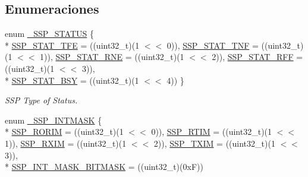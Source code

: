 \subsection*{Enumeraciones}
\begin{DoxyCompactItemize}
\item 
enum \hyperlink{group___s_s_p__18_x_x__43_x_x_ga4ec33a0121a2ccab848c7b37907d9e9d}{\+\_\+\+S\+S\+P\+\_\+\+S\+T\+A\+T\+US} \{ \\*
\hyperlink{group___s_s_p__18_x_x__43_x_x_gga4ec33a0121a2ccab848c7b37907d9e9daf2476dad0360373ccb5896f6f4283569}{S\+S\+P\+\_\+\+S\+T\+A\+T\+\_\+\+T\+FE} = ((uint32\+\_\+t)(1 $<$$<$ 0)), 
\hyperlink{group___s_s_p__18_x_x__43_x_x_gga4ec33a0121a2ccab848c7b37907d9e9da895067b502eeae3c476190e309abde1a}{S\+S\+P\+\_\+\+S\+T\+A\+T\+\_\+\+T\+NF} = ((uint32\+\_\+t)(1 $<$$<$ 1)), 
\hyperlink{group___s_s_p__18_x_x__43_x_x_gga4ec33a0121a2ccab848c7b37907d9e9da82f15e0720cc2b0dc53e90b7546fb96b}{S\+S\+P\+\_\+\+S\+T\+A\+T\+\_\+\+R\+NE} = ((uint32\+\_\+t)(1 $<$$<$ 2)), 
\hyperlink{group___s_s_p__18_x_x__43_x_x_gga4ec33a0121a2ccab848c7b37907d9e9dad10671a086364beb55efad01f2c3688f}{S\+S\+P\+\_\+\+S\+T\+A\+T\+\_\+\+R\+FF} = ((uint32\+\_\+t)(1 $<$$<$ 3)), 
\\*
\hyperlink{group___s_s_p__18_x_x__43_x_x_gga4ec33a0121a2ccab848c7b37907d9e9da5129659a9c16fdda33b925f07cf8ef52}{S\+S\+P\+\_\+\+S\+T\+A\+T\+\_\+\+B\+SY} = ((uint32\+\_\+t)(1 $<$$<$ 4))
 \}\begin{DoxyCompactList}\small\item\em S\+SP Type of Status. \end{DoxyCompactList}
\item 
enum \hyperlink{group___s_s_p__18_x_x__43_x_x_gab6a0ac593093184dd21c95f53b30f4ef}{\+\_\+\+S\+S\+P\+\_\+\+I\+N\+T\+M\+A\+SK} \{ \\*
\hyperlink{group___s_s_p__18_x_x__43_x_x_ggab6a0ac593093184dd21c95f53b30f4efa891bf6d7622b4f6f010396f08a51adbf}{S\+S\+P\+\_\+\+R\+O\+R\+IM} = ((uint32\+\_\+t)(1 $<$$<$ 0)), 
\hyperlink{group___s_s_p__18_x_x__43_x_x_ggab6a0ac593093184dd21c95f53b30f4efaabb6398ce8ef5db95fc47fc2bd525f13}{S\+S\+P\+\_\+\+R\+T\+IM} = ((uint32\+\_\+t)(1 $<$$<$ 1)), 
\hyperlink{group___s_s_p__18_x_x__43_x_x_ggab6a0ac593093184dd21c95f53b30f4efa2fff5a42799aae53c7a4bf3e3a900448}{S\+S\+P\+\_\+\+R\+X\+IM} = ((uint32\+\_\+t)(1 $<$$<$ 2)), 
\hyperlink{group___s_s_p__18_x_x__43_x_x_ggab6a0ac593093184dd21c95f53b30f4efa34e61a5c1d77d3763e4f8e1bfacbdcc4}{S\+S\+P\+\_\+\+T\+X\+IM} = ((uint32\+\_\+t)(1 $<$$<$ 3)), 
\\*
\hyperlink{group___s_s_p__18_x_x__43_x_x_ggab6a0ac593093184dd21c95f53b30f4efa46081a07592bbc197435bbb21cc1e201}{S\+S\+P\+\_\+\+I\+N\+T\+\_\+\+M\+A\+S\+K\+\_\+\+B\+I\+T\+M\+A\+SK} = ((uint32\+\_\+t)(0xF))
$$
\end{DoxyCompactItemize}
